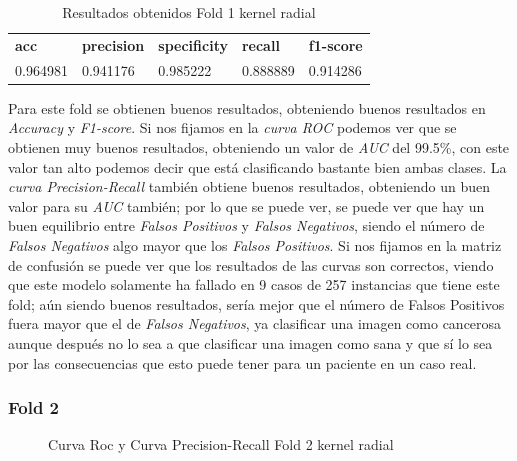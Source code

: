 \begin{table}[H]
	\centering
	\begin{tabular}{lllll}
		\textbf{acc} & \textbf{precision} & \textbf{specificity} & \textbf{recall} & \textbf{f1-score} \\
		0.964981     & 0.941176           & 0.985222             & 0.888889        & 0.914286         \\
	\end{tabular}
	\caption{Resultados obtenidos Fold 1 kernel radial}
	\label{table:1}
\end{table}


Para este fold se obtienen buenos resultados, obteniendo buenos resultados en \textit{Accuracy} y \textit{F1-score}. Si nos fijamos en la \textit{curva ROC} podemos ver que se obtienen muy buenos resultados, obteniendo un valor de \textit{AUC} del 99.5\%, con este valor tan alto podemos decir que está clasificando bastante bien ambas clases. La \textit{curva Precision-Recall} también obtiene buenos resultados, obteniendo un buen valor para su \textit{AUC} también; por lo que se puede ver, se puede ver que hay un buen equilibrio entre \textit{Falsos Positivos} y \textit{Falsos Negativos}, siendo el número de \textit{Falsos Negativos} algo mayor que los \textit{Falsos Positivos}. Si nos fijamos en la matriz de confusión se puede ver que los resultados de las curvas son correctos, viendo que este modelo solamente ha fallado en 9 casos de 257 instancias que tiene este fold; aún siendo buenos resultados, sería mejor que el número de Falsos Positivos fuera mayor que el de \textit{Falsos Negativos}, ya clasificar una imagen como cancerosa aunque después no lo sea a que clasificar una imagen como sana y que sí lo sea por las consecuencias que esto puede tener para un paciente en un caso real.

\subsubsection{Fold 2}

\begin{figure}[H]
	\centering
	\caption{Curva Roc y Curva Precision-Recall Fold 2 kernel radial}
	\label{fig:resultados2}
\end{figure}

